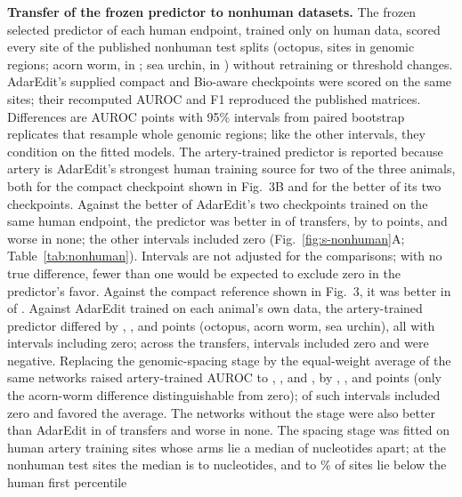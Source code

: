 \documentclass[9pt,twoside]{pnas-new}
\begin{document}


\textbf{Transfer of the frozen predictor to nonhuman datasets.} The frozen selected predictor of each human endpoint, trained only on human data, scored every site of the published nonhuman test splits (octopus, \NonhumanTestSitesOctopus{} sites in \NonhumanTestRegionsOctopus{} genomic regions; acorn worm, \NonhumanTestSitesPtychodera{} in \NonhumanTestRegionsPtychodera{}; sea urchin, \NonhumanTestSitesStrongylocentrotus{} in \NonhumanTestRegionsStrongylocentrotus{}) without retraining or threshold changes. AdarEdit's supplied compact and Bio-aware checkpoints were scored on the same sites; their recomputed AUROC and F1 reproduced the published matrices. Differences are AUROC points with 95\% intervals from \NonhumanBootstrapReplicates{} paired bootstrap replicates that resample whole genomic regions; like the other intervals, they condition on the fitted models. The artery-trained predictor is reported because artery is AdarEdit's strongest human training source for two of the three animals, both for the compact checkpoint shown in Fig.~3B and for the better of its two checkpoints. Against the better of AdarEdit's two checkpoints trained on the same human endpoint, the predictor was better in \NonhumanBetterCount{} of \NonhumanTransferCount{} transfers, by \NonhumanBetterDeltaMin{} to \NonhumanBetterDeltaMax{} points, and worse in none; the other intervals included zero (Fig.~\ref{fig:s-nonhuman}A; Table~\ref{tab:nonhuman}). Intervals are not adjusted for the \NonhumanTransferCount{} comparisons; with no true difference, fewer than one would be expected to exclude zero in the predictor's favor. Against the compact reference shown in Fig.~3, it was better in \NonhumanReferenceBetterCount{} of \NonhumanTransferCount{}. Against AdarEdit trained on each animal's own data, the artery-trained predictor differed by \NonhumanOwnDeltaOctopus{}, \NonhumanOwnDeltaPtychodera{}, and \NonhumanOwnDeltaStrongylocentrotus{} points (octopus, acorn worm, sea urchin), all with intervals including zero; across the \NonhumanTransferCount{} transfers, \NonhumanOwnTiedCount{} intervals included zero and \NonhumanOwnWorseCount{} were negative. Replacing the genomic-spacing stage by the equal-weight average of the same networks raised artery-trained AUROC to \NonhumanNoGapArteryAUROCOctopus{}, \NonhumanNoGapArteryAUROCPtychodera{}, and \NonhumanNoGapArteryAUROCStrongylocentrotus{}, by \NonhumanSpacingDeltaOctopus{}, \NonhumanSpacingDeltaPtychodera{}, and \NonhumanSpacingDeltaStrongylocentrotus{} points (only the acorn-worm difference distinguishable from zero); \NonhumanSpacingTiedCount{} of \NonhumanTransferCount{} such intervals included zero and \NonhumanSpacingWorseCount{} favored the average. The networks without the stage were also better than AdarEdit in \NonhumanNoGapBetterCount{} of \NonhumanTransferCount{} transfers and worse in none. The spacing stage was fitted on human artery training sites whose arms lie a median of \NonhumanHumanMedianGap{} nucleotides apart; at the nonhuman test sites the median is \NonhumanMedianGapMin{} to \NonhumanMedianGapMax{} nucleotides, and \NonhumanBelowHumanPOneMin{} to \NonhumanBelowHumanPOneMax{}\% of sites lie below the human first percentile 
\end{document}
